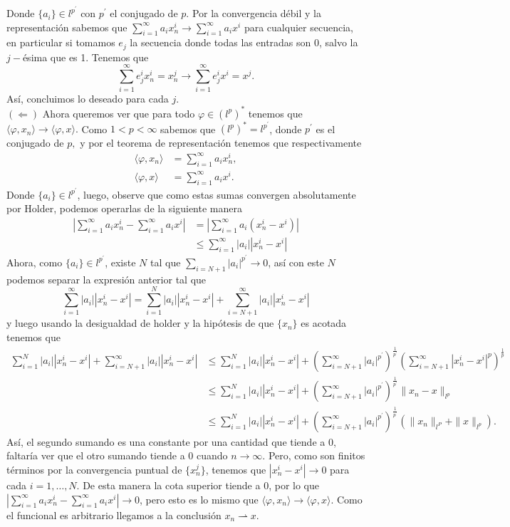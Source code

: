 \begin{itemize}
\begin{sproof}
     Donde $\{a_i\}\in l^{p^\prime}$ con $p^\prime$ el conjugado de $p$. Por la convergencia débil y la representación sabemos que $\displaystyle\sum_{i=1}^\infty a_ix_n^i\to\displaystyle\sum_{i=1}^\infty a_ix^i$ para cualquier secuencia, en particular si tomamos $e_j$ la secuencia donde todas las entradas son 0, salvo la $j-$ésima que es 1. Tenemos que 
     $$\sum_{i=1}^\infty e_j^ix_n^i=x_n^j\to\sum_{i=1}^\infty e_j^ix^i=x^j.$$
     Así, concluimos lo deseado para cada $j.$\\
     $(\Leftarrow)$ Ahora queremos ver que para todo $\varphi\in (l^p)^*$ tenemos que $\langle\varphi,x_n\rangle\to\langle\varphi,x\rangle.$ Como $1<p<\infty$ sabemos que $(l^p)^*=l^{p^\prime}$, donde $p^\prime$ es el conjugado de $p,$ y por el teorema de representación tenemos que respectivamente 
     \begin{align*}
       \langle\varphi,x_n\rangle&=\sum_{i=1}^\infty a_ix_n^i,\\
       \langle\varphi,x\rangle&=\sum_{i=1}^\infty a_ix^i.
     \end{align*} 
     Donde $\{a_i\}\in l^{p^\prime}$, luego, observe que como estas sumas convergen absolutamente por Holder, podemos operarlas de la siguiente manera
     \begin{align*}
       \left|\sum_{i=1}^\infty a_ix_n^i-\sum_{i=1}^\infty a_ix^i\right|&=\left|\sum_{i=1}^\infty a_i(x_n^i-x^i)\right|\\
       &\leq \sum_{i=1}^\infty |a_i||x_n^i-x^i|
     \end{align*}
     Ahora, como $\{a_i\}\in l^{p^\prime}$, existe $N$ tal que $\displaystyle\sum_{i=N+1}|a_i|^{p^\prime}\to 0$, así con este $N$ podemos separar la expresión anterior tal que
     $$\sum_{i=1}^\infty |a_i||x_n^i-x^i|=\sum_{i=1}^N |a_i||x_n^i-x^i|+\sum_{i=N+1}^\infty |a_i||x_n^i-x^i|$$
     y luego usando la desigualdad de holder y la hipótesis de que $\{x_n\}$ es acotada tenemos que
     \begin{align*}
       \sum_{i=1}^N |a_i||x_n^i-x^i|+\sum_{i=N+1}^\infty |a_i||x_n^i-x^i|&\leq\sum_{i=1}^N |a_i||x_n^i-x^i|+\left(\sum_{i=N+1}^\infty |a_i|^{p^\prime}\right)^{\frac{1}{p^\prime}}\left( \sum_{i=N+1}^\infty|x_n^i-x^i|^p \right)^{\frac{1}{p}}\\
       &\leq\sum_{i=1}^N |a_i||x_n^i-x^i|+\left(\sum_{i=N+1}^\infty |a_i|^{p^\prime}\right)^{\frac{1}{p^\prime}}\|x_n-x\|_{l^p}\\
       &\leq\sum_{i=1}^N |a_i||x_n^i-x^i|+\left(\sum_{i=N+1}^\infty |a_i|^{p^\prime}\right)^{\frac{1}{p^\prime}}(\|x_n\|_{l^P}+\|x\|_{l^p}).
     \end{align*}
     Así, el segundo sumando es una constante por una cantidad que tiende a 0, faltaría ver que el otro sumando tiende a 0 cuando $n\to\infty.$ Pero, como son finitos términos por la convergencia puntual de $\{x_n^j\}$, tenemos que $|x_n^i-x^i|\to 0$ para cada $i=1, \ldots, N.$ De esta manera la cota superior tiende a 0, por lo que $\left|\displaystyle\sum_{i=1}^\infty a_ix_n^i-\displaystyle\sum_{i=1}^\infty a_ix^i\right|\to 0$, pero esto es lo mismo que $\langle\varphi,x_n\rangle\to\langle\varphi,x\rangle.$ Como el funcional es arbitrario llegamos a la conclusión $x_n \rightharpoonup x$.



\end{sproof}
\end{itemize}
